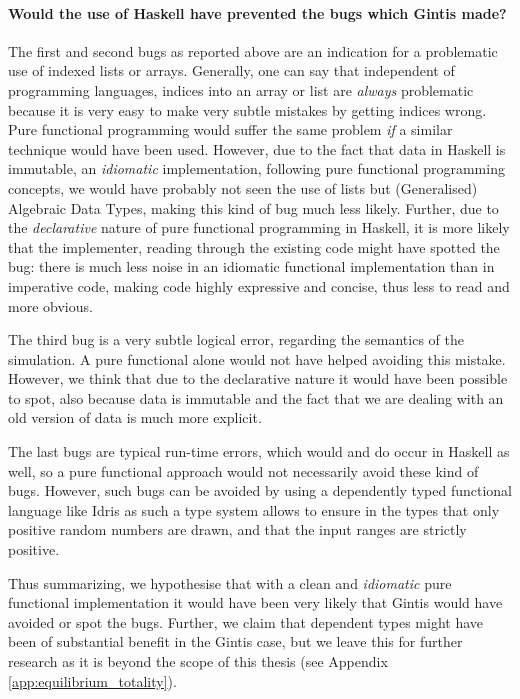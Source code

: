 \paragraph{Would the use of Haskell have prevented the bugs which Gintis made?}
The first and second bugs as reported above are an indication for a problematic use of indexed lists or arrays. Generally, one can say that independent of programming languages, indices into an array or list are \textit{always} problematic because it is very easy to make very subtle mistakes by getting indices wrong. Pure functional programming would suffer the same problem \textit{if} a similar technique would have been used. However, due to the fact that data in Haskell is immutable, an \textit{idiomatic} implementation, following pure functional programming concepts, we would have probably not seen the use of lists but (Generalised) Algebraic Data Types, making this kind of bug much less likely. Further, due to the \textit{declarative} nature of pure functional programming in Haskell, it is more likely that the implementer, reading through the existing code might have spotted the bug: there is much less noise in an idiomatic functional implementation than in imperative code, making code highly expressive and concise, thus less to read and more obvious.

The third bug is a very subtle logical error, regarding the semantics of the simulation. A pure functional alone would not have helped avoiding this mistake. However, we think that due to the declarative nature it would have been possible to spot, also because data is immutable and the fact that we are dealing with an old version of data is much more explicit. 

The last bugs are typical run-time errors, which would and do occur in Haskell as well, so a pure functional approach would not necessarily avoid these kind of bugs. However, such bugs can be avoided by using a dependently typed functional language like Idris \cite{brady_idris_2013} as such a type system allows to ensure in the types that only positive random numbers are drawn, and that the input ranges are strictly positive.

Thus summarizing, we hypothesise that with a clean and \textit{idiomatic} pure functional implementation it would have been very likely that Gintis would have avoided or spot the bugs. Further, we claim that dependent types might have been of substantial benefit in the Gintis case, but we leave this for further research as it is beyond the scope of this thesis (see Appendix \ref{app:equilibrium_totality}).

